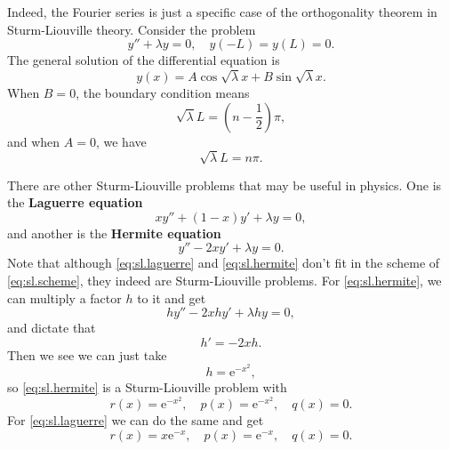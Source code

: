 \documentclass[hyperref, a4paper]{article}
\newcommand*{\ee}{\mathrm{e}}
\newcommand*{\concept}[1]{{\textbf{#1}}}
\begin{document}
Indeed, the Fourier series is just a specific case of 
the orthogonality theorem in Sturm-Liouville theory. 
Consider the problem 
\begin{equation}
    y'' + \lambda y = 0, \quad 
    y(-L) = y(L) = 0.
\end{equation}
The general solution of the differential equation is 
\[
    y(x) = A \cos \sqrt{\lambda} x + B \sin \sqrt{\lambda} x.
\]
When $B = 0$, 
the boundary condition means 
\begin{equation}
    \sqrt{\lambda} L = \left( n - \frac{1}{2} \right) \pi,
\end{equation}
and when $A = 0$, 
we have 
\begin{equation}
    \sqrt{\lambda} L = n \pi.
\end{equation}

There are other Sturm-Liouville problems that may be useful in physics. 
One is the \concept{Laguerre equation} 
\begin{equation}
    x y'' + (1 - x) y' + \lambda y = 0,
    \label{eq:sl.laguerre}
\end{equation}
and another is the \concept{Hermite equation} 
\begin{equation}
    y'' - 2 x y' + \lambda y = 0.
    \label{eq:sl.hermite}
\end{equation}
Note that although \eqref{eq:sl.laguerre} and \eqref{eq:sl.hermite} 
don't fit in the scheme of \eqref{eq:sl.scheme},
they indeed are Sturm-Liouville problems.
For \eqref{eq:sl.hermite}, 
we can multiply a factor $h$ to it and get 
\[
    h y'' - 2 x h y' + \lambda h y = 0,
\]
and dictate that 
\[
    h' = - 2 x h.
\]
Then we see we can just take 
\[
    h = \ee^{- x^2},
\]
so \eqref{eq:sl.hermite} is a Sturm-Liouville problem with 
\begin{equation}
    r(x) = \ee^{-x^2}, \quad p(x) = \ee^{-x^2}, \quad q(x) = 0.
\end{equation}
For \eqref{eq:sl.laguerre} we can do the same and get 
\begin{equation}
    r(x) = x \ee^{-x}, \quad 
    p(x) = \ee^{-x}, \quad 
    q(x) = 0.
\end{equation}
\end{document}
